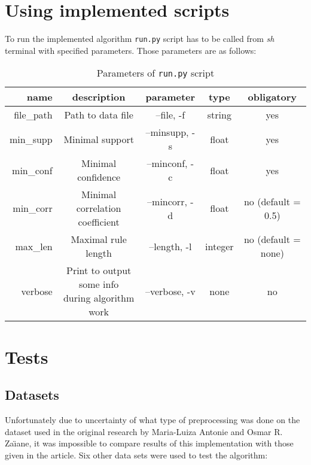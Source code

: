 \documentclass{article}
\begin{document}
	\section{Using implemented scripts}
	To run the implemented algorithm \texttt{run.py} script has to be called from \textit{sh} terminal with specified parameters. Those parameters are as follows:
	\begin{table}[H]
		\centering
		\caption{Parameters of \texttt{run.py} script}
		\begin{tabular}{r|c c c c}
		name&description&parameter&type&obligatory\\
		\hline
		file\_path&Path to data file&--file, -f&string&yes\\
		\hline
		min\_supp&Minimal support&--minsupp, -s&float&yes\\
		\hline
		min\_conf&Minimal confidence&--minconf, -c&float&yes\\
		\hline
		min\_corr&Minimal correlation coefficient&--mincorr, -d&float&no (default = 0.5)\\
		\hline
		max\_len&Maximal rule length&--length, -l&integer&no (default = none)\\
		\hline
		verbose&\makecell{Print to output some info\\ during algorithm work}&--verbose, -v& none &no\\
		\end{tabular}
	\end{table}
	
	
	\section{Tests}
	\subsection{Datasets}
	Unfortunately due to uncertainty of what type of preprocessing was done on the dataset used in the original research by Maria-Luiza Antonie and Osmar R. Za\"{\i}ane, it was impossible to compare results of this implementation with those given in the article. Six other data sets were used to test the algorithm: 
	\newpage
		
\end{document}
